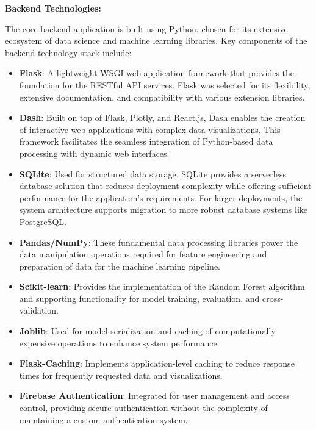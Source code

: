 \documentclass[12pt,a4paper]{report}
\begin{document}
\textbf{Backend Technologies:}

The core backend application is built using Python, chosen for its extensive ecosystem of data science and machine learning libraries. Key components of the backend technology stack include:

\begin{itemize}
    \item \textbf{Flask}: A lightweight WSGI web application framework that provides the foundation for the RESTful API services. Flask was selected for its flexibility, extensive documentation, and compatibility with various extension libraries.
    
    \item \textbf{Dash}: Built on top of Flask, Plotly, and React.js, Dash enables the creation of interactive web applications with complex data visualizations. This framework facilitates the seamless integration of Python-based data processing with dynamic web interfaces.
    
    \item \textbf{SQLite}: Used for structured data storage, SQLite provides a serverless database solution that reduces deployment complexity while offering sufficient performance for the application's requirements. For larger deployments, the system architecture supports migration to more robust database systems like PostgreSQL.
    
    \item \textbf{Pandas/NumPy}: These fundamental data processing libraries power the data manipulation operations required for feature engineering and preparation of data for the machine learning pipeline.
    
    \item \textbf{Scikit-learn}: Provides the implementation of the Random Forest algorithm and supporting functionality for model training, evaluation, and cross-validation.
    
    \item \textbf{Joblib}: Used for model serialization and caching of computationally expensive operations to enhance system performance.
    
    \item \textbf{Flask-Caching}: Implements application-level caching to reduce response times for frequently requested data and visualizations.
    
    \item \textbf{Firebase Authentication}: Integrated for user management and access control, providing secure authentication without the complexity of maintaining a custom authentication system.
\end{itemize}
\end{document}
